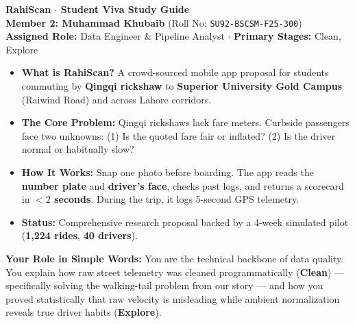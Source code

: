 \documentclass[10pt, a4paper]{article}
\begin{document}
\begin{tcolorbox}[enhanced, colback=navyblue, colframe=navyblue, arc=3pt, left=8pt, right=8pt, top=4pt, bottom=4pt]
  {\fontsize{15pt}{17pt}\selectfont\color{white}\bfseries RahiScan \(\cdot\) Student Viva Study Guide}\\[1.5pt]
  {\fontsize{10pt}{12pt}\selectfont\color{softteal}\textbf{Member 2: Muhammad Khubaib} (Roll No: \texttt{SU92-BSCSM-F25-300})}\\[1pt]
  {\fontsize{8.5pt}{10.5pt}\selectfont\color{white!85!softblue}\textbf{Assigned Role:} Data Engineer \& Pipeline Analyst \(\cdot\) \textbf{Primary Stages:} Clean, Explore}
\end{tcolorbox}

\begin{overviewbox}
\footnotesize
\begin{itemize}\setlength{\itemsep}{0.8pt}\setlength{\parskip}{0pt}
  \item \textbf{What is RahiScan?} A crowd-sourced mobile app proposal for students commuting by \textbf{Qingqi rickshaw} to \textbf{Superior University Gold Campus} (Raiwind Road) and across Lahore corridors.
  \item \textbf{The Core Problem:} Qingqi rickshaws lack fare meters. Curbside passengers face two unknowns: (1) Is the quoted fare fair or inflated? (2) Is the driver normal or habitually slow?
  \item \textbf{How It Works:} Snap one photo before boarding. The app reads the \textbf{number plate} and \textbf{driver's face}, checks past logs, and returns a scorecard in \textbf{\(< 2\) seconds}. During the trip, it logs 5-second GPS telemetry.
  \item \textbf{Status:} Comprehensive research proposal backed by a 4-week simulated pilot (\textbf{1,224 rides}, \textbf{40 drivers}).
\end{itemize}
\end{overviewbox}

\begin{tcolorbox}[enhanced, colback=white, colframe=bordergray, boxrule=0.4pt, arc=2.5pt, left=6pt, right=6pt, top=2.5pt, bottom=2.5pt]
  \footnotesize \textbf{Your Role in Simple Words:} You are the technical backbone of data quality. You explain how raw street telemetry was cleaned programmatically (\textbf{Clean}) --- specifically solving the walking-tail problem from our story --- and how you proved statistically that raw velocity is misleading while ambient normalization reveals true driver habits (\textbf{Explore}).
\end{tcolorbox}
\end{document}
